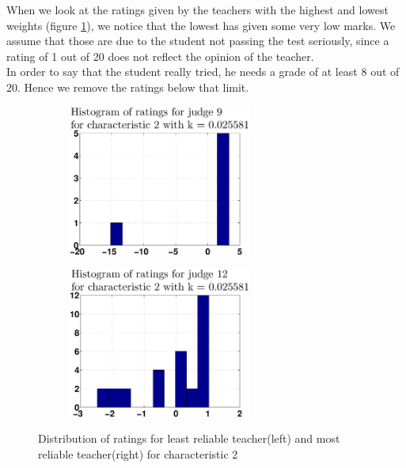 \documentclass[12pt,a4paper]{article}
\begin{document}
When we look at the ratings given by the teachers with the highest and lowest weights (figure \ref{hlhist}), we notice that the lowest has given some very low marks. We assume that those are due to the student not passing the test seriously, since a rating of 1 out of 20 does not reflect the opinion of the teacher.\\
In order to say that the student really tried, he needs a grade of at least 8 out of 20. Hence we remove the ratings below that limit.

\begin{figure}[!h]
\centering
\begin{subfigure}[b]{0.48\textwidth}
\includegraphics[width = 6cm]{preprocess/ppdistribLeastRelK406ff9f387c1ccacc2.eps}
\end{subfigure}
\begin{subfigure}[b]{0.48\textwidth}
\includegraphics[width = 6cm]{preprocess/ppdistribMostRelK406ff9f387c1ccacc2.eps}
\end{subfigure}
\caption{\label{hlhist}Distribution of ratings for least reliable teacher(left) and most reliable teacher(right) for characteristic 2}
\end{figure}
\FloatBarrier
\end{document}
